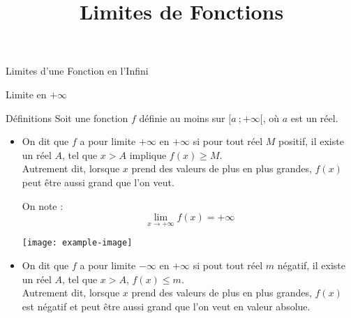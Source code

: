 \documentclass{cours}
\title{Limites de Fonctions}
\begin{document}

    \begin{Gpartie}{Limites d'une Fonction en l'Infini} 
        \begin{Spartie}{Limite en $+\infty$} 
            \begin{SSpartie}{Définitions} 
                Soit une fonction $f$ définie au moins sur $\big[a~;+\infty\big[$, où $a$ est un réel.

                \begin{itemize}
                    \item   On dit que $f$ a pour limite $+\infty$ en $+\infty$ si pour tout réel $M$ positif, il existe un réel $A$, tel que $x>A$ implique $f(x)\geq M$. \\ Autrement dit, lorsque $x$ prend des valeurs de plus en plus grandes, $f(x)$ peut être aussi grand que l'on veut.
                    
                    On note : \[\lim\limits_{x\to +\infty}f(x)=+\infty\] 
                    \begin{center}
                            \texttt{[image: example-image]}
                        \parbox{\linewidth}{}
                    \end{center}
                    \vspace*{2ex}
                    \item   On dit que $f$ a pour limite $-\infty$ en $+\infty$ si pout tout réel $m$ négatif, il existe un réel $A$, tel que $x>A$, $f(x)\leq m$. \\ Autrement dit, lorsque $x$ prend des valeurs de plus en plus grandes, $f(x)$ est négatif et peut être aussi grand que l'on veut en valeur absolue.
                    

\end{itemize}
\end{SSpartie}
\end{Spartie}
\end{Gpartie}
\end{document}
